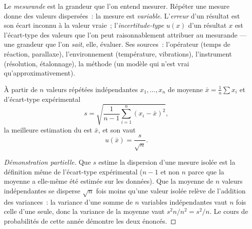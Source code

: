 \begin{definition}\label{def:b1:units-dimensions:uncertainty}
Le \emph{mesurande} est la grandeur que l'on entend mesurer. Répéter une
mesure donne des valeurs dispersées~: la mesure est \emph{variable}.
L'\emph{erreur} d'un résultat est son écart inconnu à la valeur vraie~;
l'\emph{incertitude-type} $u(x)$ d'un résultat $x$ est l'écart-type des
valeurs que l'on peut raisonnablement attribuer au mesurande --- une
grandeur que l'on \emph{sait}, elle, évaluer. Ses sources~: l'opérateur
(temps de réaction, parallaxe), l'environnement (température,
vibrations), l'instrument (résolution, étalonnage), la méthode (un
modèle qui n'est vrai qu'approximativement).
\end{definition}

\begin{proposition}\label{prop:b1:units-dimensions:typeA}
À partir de $n$ valeurs répétées indépendantes $x_1, \dots, x_n$ de
moyenne $\bar x = \frac1n \sum x_i$ et d'écart-type expérimental
\[
s = \sqrt{\frac{1}{n-1}\sum_{i=1}^n (x_i - \bar x)^2},
\]
la meilleure estimation du  est $\bar x$, et son
 vaut
\[
u(\bar x) = \frac{s}{\sqrt n} .
\]
\end{proposition}

\begin{proof}[Démonstration partielle]
Que $s$ estime la dispersion d'une mesure isolée est la définition même
de l'écart-type expérimental ($n - 1$ et non $n$ parce que la moyenne
a elle-même été estimée sur les données). Que la moyenne de $n$ valeurs
indépendantes se disperse $\sqrt n$ fois moins qu'une valeur isolée
relève de l'addition des variances~: la variance d'une somme de $n$
variables indépendantes vaut $n$ fois celle d'une seule, donc la
variance de la moyenne vaut $s^2 n / n^2 = s^2/n$. Le cours de
probabilités de cette année démontre les deux énoncés.
\end{proof}

